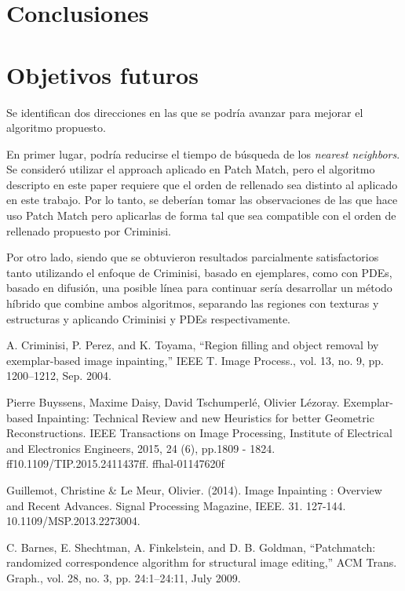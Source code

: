 \documentclass[conference]{IEEEtran}
\begin{document}



\section{Conclusiones}

\section{Objetivos futuros}

Se identifican dos direcciones en las que se podr\'ia avanzar para mejorar el algoritmo
propuesto. 

En primer lugar, podr\'ia reducirse el tiempo de b\'usqueda de los \textit{nearest
neighbors}. Se consider\'o utilizar el approach aplicado en Patch Match, pero el 
algoritmo descripto en este paper requiere que el orden de rellenado sea distinto
al aplicado en este trabajo. Por lo tanto, se deber\'ian tomar las observaciones de
las que hace uso Patch Match pero aplicarlas de forma tal que sea compatible con
el orden de rellenado propuesto por Criminisi.

Por otro lado, siendo que se obtuvieron resultados parcialmente satisfactorios tanto
utilizando el enfoque de Criminisi, basado en ejemplares, como con PDEs, basado en
difusi\'on, una posible l\'inea para continuar ser\'ia desarrollar un m\'etodo h\'ibrido
que combine ambos algoritmos, separando las regiones con texturas y estructuras
y aplicando Criminisi y PDEs respectivamente.


\begin{thebibliography}{00}
 A. Criminisi, P. Perez, and K. Toyama, “Region filling and object 
removal by exemplar-based image inpainting,” IEEE T. Image Process.,
vol. 13, no. 9, pp. 1200–1212, Sep. 2004.

 Pierre Buyssens, Maxime Daisy, David Tschumperlé, Olivier Lézoray. Exemplar-based Inpainting:
Technical Review and new Heuristics for better Geometric Reconstructions. IEEE Transactions on
Image Processing, Institute of Electrical and Electronics Engineers, 2015, 24 (6), pp.1809 - 1824.
ff10.1109/TIP.2015.2411437ff. ffhal-01147620f

 Guillemot, Christine \& Le Meur, Olivier. (2014). Image Inpainting : Overview and Recent Advances. Signal Processing Magazine, IEEE. 31. 127-144. 10.1109/MSP.2013.2273004. 

 C. Barnes, E. Shechtman, A. Finkelstein, and D. B. Goldman, ``Patchmatch: randomized correspondence algorithm for structural image editing,'' ACM Trans. Graph., vol. 28, no. 3, pp. 24:1–24:11, July 2009.

\end{thebibliography}
\end{document}
